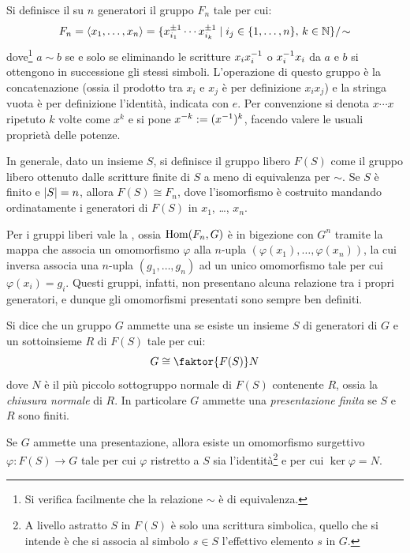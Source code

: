 \documentclass[11pt]{scrartcl}
\begin{document}
	\begin{definition}
		Si definisce il  su $n$ generatori
		il gruppo $F_n$ tale per cui:
		\[ F_n = \langle{x_1, \ldots, x_n\rangle} = \{ x_{i_1}^{\pm 1} \cdots x_{i_k}^{\pm 1} \mid i_j \in \{1, \ldots, n\}, \, k \in \mathbb N \} / \! \sim \]
		dove\footnote{
			Si verifica facilmente che la relazione $\sim$ è di equivalenza.
		} $a \sim b$ se e solo se eliminando le scritture $x_i x_i^{-1}$ 
		o $x_i^{-1} x_i$ da $a$ e $b$ si ottengono in successione gli stessi simboli.
		L'operazione di
		questo gruppo è la concatenazione (ossia il prodotto tra
		$x_i$ e $x_j$ è per definizione $x_i x_j$) e la stringa
		vuota è per definizione l'identità, indicata con $e$.
		Per convenzione si denota $x \cdots x$ ripetuto $k$ volte come $x^k$ e si pone $x^{-k} := (x^{-1})^k$, facendo
		valere le usuali proprietà delle potenze.
	\end{definition}
	
	
	\begin{remark}
		In generale, dato un insieme $S$, si definisce
		il gruppo libero $F(S)$ come il gruppo libero ottenuto
		dalle scritture finite di $S$ a meno di equivalenza per
		$\sim$. Se $S$ è finito e $\left\lvert S \right\rvert = n$, allora
		$F(S) \cong F_n$, dove l'isomorfismo è costruito mandando
		ordinatamente i generatori di $F(S)$ in
		$x_1$, \ldots, $x_n$.
	\end{remark}
	
	
	Per i gruppi liberi vale la \vocab{proprietà universale},
	ossia $\operatorname{Hom}(F_n, G)$ è in bigezione con $G^n$ tramite
	la mappa che associa un omomorfismo $\varphi$ alla $n$-upla
	$(\varphi(x_1), \ldots, \varphi(x_n))$, la cui inversa associa
	una $n$-upla $(g_1, \ldots, g_n)$ ad un unico omomorfismo
	tale per cui $\varphi(x_i) = g_i$. Questi gruppi, infatti,
	non presentano alcuna relazione tra i propri generatori,
	e dunque gli omomorfismi presentati sono sempre ben definiti. \medskip
	
	
	\begin{definition}
		Si dice che un gruppo $G$ ammette una  se esiste un insieme $S$ di generatori di $G$ e un sottoinsieme $R$ di $F(S)$ tale per cui:
		\[ G \cong \faktor{F(S)}N \]
		dove $N$ è il più piccolo sottogruppo normale di
		$F(S)$ contenente $R$, ossia la \textit{chiusura normale}
		di $R$. In particolare $G$ ammette una \textit{presentazione finita} se $S$ e $R$ sono finiti.
	\end{definition}
	\medskip
	
	
	Se $G$ ammette una presentazione, allora esiste un
	omomorfismo surgettivo $\varphi : F(S) \to G$ tale
	per cui $\varphi$ ristretto a $S$ sia l'identità\footnote{
		A livello astratto $S$ in $F(S)$ è solo una scrittura
		simbolica, quello che si intende è che si associa
		al simbolo $s \in S$ l'effettivo elemento $s$ in
		$G$.
	} e per cui $\ker \varphi = N$. \medskip
	
\end{document}
